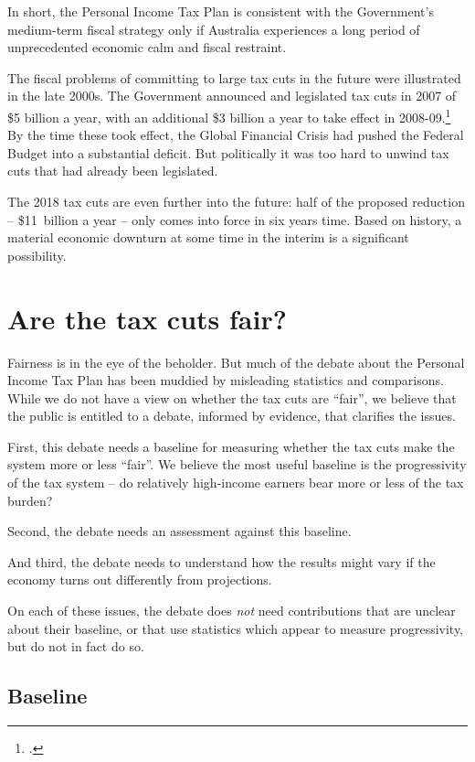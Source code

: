 \documentclass[submission]{grattan}\usepackage[]{graphicx}\usepackage[]{color}
\begin{document}
In short, the Personal Income Tax Plan is consistent with the Government's medium-term fiscal strategy only if Australia experiences a long period of unprecedented economic calm and fiscal restraint.

The fiscal problems of committing to large tax cuts in the future were illustrated in the late 2000s. The Government announced and legislated tax cuts in 2007 of \$5 billion a year, with an additional \$3 billion a year to take effect in 2008-09.\footcite[][3]{Treasury2007}
By the time these took effect, the Global Financial Crisis had pushed the Federal Budget into a substantial deficit. But politically it was too hard to unwind tax cuts that had already been legislated.

The 2018 tax cuts are even further into the future: half of the proposed reduction -- \$11~billion a year -- only comes into force in six years time. Based on history, a material economic downturn at some time in the interim is a significant possibility.


\chapter{Are the tax cuts fair?}\label{chap:are-the-tax-cuts-fair}

Fairness is in the eye of the beholder. But much of the debate about the Personal Income Tax Plan has been muddied by misleading statistics and comparisons. While we do not have a view on whether the tax cuts are ``fair'', we believe that the public is entitled to a debate, informed by evidence, that clarifies the issues.

First, this debate needs a baseline for measuring whether the tax cuts make the system more or less ``fair''. We believe the most useful baseline is the progressivity of the tax system -- do relatively high-income earners bear more or less of the tax burden?

Second, the debate needs an assessment against this baseline.

And third, the debate needs to understand how the results might vary if the economy turns out differently from projections.

On each of these issues, the debate does \emph{not} need contributions that are unclear about their baseline, or that use statistics which appear to measure progressivity, but do not in fact do so.

\section{Baseline}\label{sec:baseline}
\end{document}
